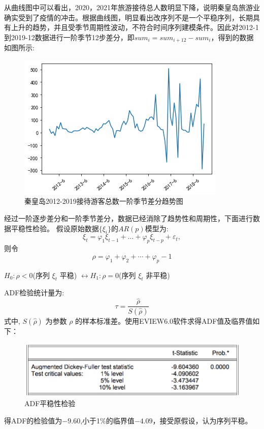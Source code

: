 	从曲线图中可以看出，2020，2021年旅游接待总人数明显下降，说明秦皇岛旅游业确实受到了疫情的冲击。根据曲线图，明显看出改序列不是一个平稳序列，长期具有上升的趋势，并且受季节周期性波动，不符合时间序列建模条件。因此对2012-1到2019-12数据进行一阶季节12步差分，即$sum_i=sum_{i+12}-sum_i$，得到的数据如图所示:
\begin{figure}[H]
	\centering
	\includegraphics[scale=0.5,angle=0]{images/8.png}
	\caption{秦皇岛2012-2019接待游客总数一阶季节差分趋势图}
	\label{8}
\end{figure}
经过一阶逐步差分和一阶季节差分，数据已经消除了趋势性和周期性，下面进行数据平稳性检验。
假设原始数据$\{\xi_i\}$的$AR(p)$模型为:$$\xi_t=\varphi_1 \xi_{t-1}+ \dots + \varphi_p \xi_{t-p} + \varepsilon_t,$$则令$$\rho=\varphi_{1}+\varphi_{2}+\cdots+\varphi_{p}-1$$ 
\begin{center}$H_{0}: \rho<0  $(序列  $\xi_{t} $ 平稳) $ \leftrightarrow H_{1}: \rho=0  $(序列  $\xi_{t} $ 非平稳)  \end{center}
ADF检验统计量为:
$$\tau=\frac{\hat{\rho}}{S(\hat{\rho})}$$
式中, $ S(\hat{\rho}) $ 为参数 $ \rho $ 的样本标准差。使用EVIEW6.0软件求得ADF值及临界值如下：
\begin{figure}[htbp]
	\centering
	\includegraphics[scale=0.65,angle=0]{images/9.png}
	\caption{ADF平稳性检验}
	\label{9}
\end{figure}

得ADF的检验值为$-9.60$,小于1\%的临界值$-4.09$，接受原假设，认为序列平稳。
